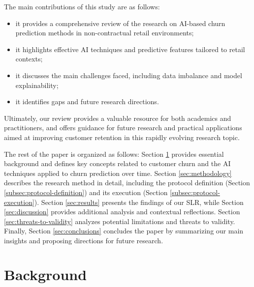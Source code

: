 \documentclass[preprint,12pt]{elsarticle}
\begin{document}
\noindent The main contributions of this study are as follows: 
\begin{itemize}[itemsep=0pt]
\item it provides a comprehensive review of the research on AI-based churn prediction methods in non-contractual retail environments;
\item it highlights effective AI techniques and predictive features tailored to retail contexts;
\item it discusses the main challenges faced, including data imbalance and model explainability;
\item it identifies gaps and future research directions.
\end{itemize}



Ultimately, our review provides a valuable resource for both academics and practitioners, and offers guidance for future research and practical applications aimed at improving customer retention in this rapidly evolving research topic.

The rest of the paper is organized as follows: Section \ref{sec:background} provides essential background and defines key concepts related to customer churn and the AI techniques applied to churn prediction over time. 
Section \ref{sec:methodology} describes the research method in detail, including the protocol definition (Section \ref{subsec:protocol-definition}) and its execution (Section \ref{subsec:protocol-execution}).
Section \ref{sec:results} presents the findings of our SLR, while Section \ref{sec:discussion} provides additional analysis and contextual reflections. 
Section  \ref{sec:threats-to-validity} analyzes potential limitations and threats to validity.
Finally, Section \ref{sec:conclusions} concludes the paper by summarizing our main insights and proposing directions for future research. 

%


\section{Background}
\label{sec:background}

\end{document}

